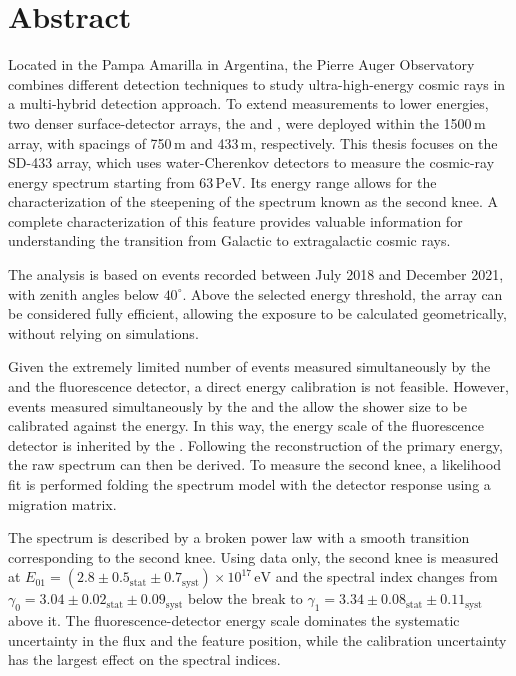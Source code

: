 \chapter*{Abstract}
\vspace{-2\baselineskip}

Located in the Pampa Amarilla in Argentina, the Pierre Auger Observatory combines different detection techniques to study ultra-high-energy cosmic rays in a multi-hybrid detection approach.
To extend measurements to lower energies, two denser surface-detector arrays, the  and , were deployed within the 1500\,m array, with spacings of 750\,m and 433\,m, respectively.
This thesis focuses on the SD-433 array, which uses water-Cherenkov detectors to measure the cosmic-ray energy spectrum starting from $63\,\mathrm{PeV}$.
Its energy range allows for the characterization of the steepening of the spectrum known as the second knee.
A complete characterization of this feature provides valuable information for understanding the transition from Galactic to extragalactic cosmic rays.

The analysis is based on \SDFourThreeThreeNEvents{} events recorded between July 2018 and December 2021, with zenith angles below $40^\circ$.
Above the selected energy threshold, the array can be considered fully efficient, allowing the exposure to be calculated geometrically, without relying on simulations.

Given the extremely limited number of events measured simultaneously by the  and the fluorescence detector, a direct energy calibration is not feasible.
However, events measured simultaneously by the  and the  allow the  shower size to be calibrated against the  energy.
In this way, the energy scale of the fluorescence detector is inherited by the .
Following the reconstruction of the primary energy, the raw spectrum can then be derived.
To measure the second knee, a likelihood fit is performed folding the spectrum model with the detector response using a migration matrix.

The spectrum is described by a broken power law with a smooth transition corresponding to the second knee.
Using  data only, the second knee is measured at $E_{01}=(2.8\pm0.5_{\mathrm{stat}}\pm0.7_{\mathrm{syst}})\times10^{17}\,\mathrm{eV}$ and the spectral index changes from $\gamma_0=3.04\pm0.02_{\mathrm{stat}}\pm0.09_{\mathrm{syst}}$ below the break to $\gamma_1=3.34\pm0.08_{\mathrm{stat}}\pm0.11_{\mathrm{syst}}$ above it.
The fluorescence-detector energy scale dominates the systematic uncertainty in the flux and the feature position, while the calibration uncertainty has the largest effect on the spectral indices.

